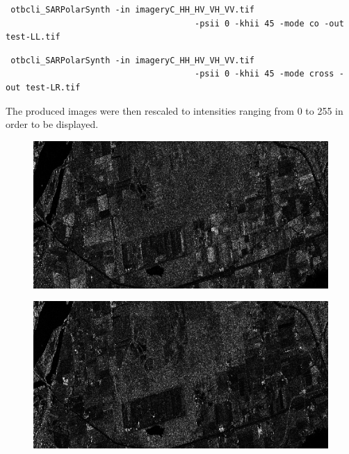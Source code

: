 \begin{verbatim} otbcli_SARPolarSynth -in imageryC_HH_HV_VH_VV.tif 
									  -psii 0 -khii 45 -mode co -out test-LL.tif \end{verbatim}
\begin{verbatim} otbcli_SARPolarSynth -in imageryC_HH_HV_VH_VV.tif 
									  -psii 0 -khii 45 -mode cross -out test-LR.tif \end{verbatim}

The produced images were then rescaled to intensities ranging from 0 to 255 in order to be displayed.


\begin{center}
  \begin{figure}[h]
    \includegraphics[width=\textwidth]{../Art/test-left-co-2.png}
    \label{fig:polsynthll}
   \end{figure}
   
   \begin{figure}[h]
    \includegraphics[width=\textwidth]{../Art/test-left-cross-2.png}
    \label{fig:polsynthlr}
   \end{figure}
\end{center}

